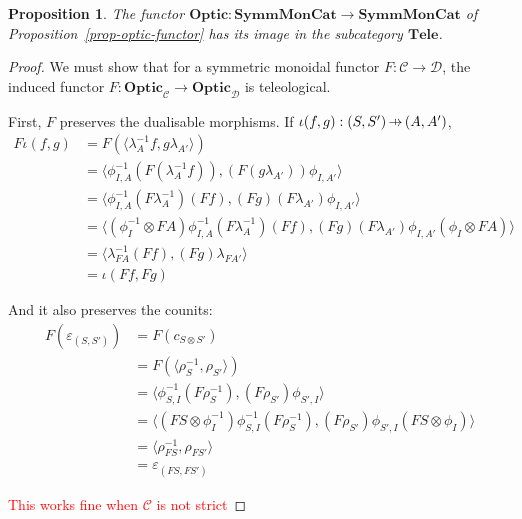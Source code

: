 \documentclass[11pt,a4paper]{article}
\theoremstyle{plain}
\newtheorem{proposition}[theorem]{Proposition}
\theoremstyle{definition}
\newcommand{\C}{\mathscr{C}}
\newcommand{\D}{\mathscr{D}}
\newcommand{\SymmMonCat}{\mathbf{SymmMonCat}}
\newcommand{\Tele}{\mathbf{Tele}}
\newcommand{\Optic}{\mathbf{Optic}}
\newcommand{\hto}{\ensuremath{\,\mathaccent\shortmid\rightarrow\,}}
\newcommand{\todo}[1]{\textcolor{red}{\small #1}}
\begin{document}

\begin{proposition}
  The functor $\Optic : \SymmMonCat \to \SymmMonCat$ of Proposition~\ref{prop-optic-functor} has its image in the subcategory $\Tele$.
\end{proposition}
\begin{proof}
  We must show that for a symmetric monoidal functor $F : \C \to \D$, the induced functor $F : \Optic_\C \to \Optic_\D$ is teleological.

  First, $F$ preserves the dualisable morphisms. If $\iota(f, g) : (S, S') \hto (A, A')$,
  \begin{align*}
    F\iota(f, g)
    &= F(\langle \lambda_A^{-1} f, g \lambda_{A'} \rangle) \\
    &= \langle \phi^{-1}_{I,A} (F(\lambda_A^{-1} f)), (F(g \lambda_{A'})) \phi_{I,A'}\rangle \\
    &= \langle \phi^{-1}_{I,A} (F\lambda_A^{-1}) (Ff), (Fg)(F \lambda_{A'}) \phi_{I,A'}\rangle \\
    &= \langle (\phi^{-1}_I \otimes FA) \phi^{-1}_{I,A} (F\lambda_A^{-1}) (Ff), (Fg)(F \lambda_{A'}) \phi_{I,A'} (\phi_I \otimes FA) \rangle \\
    &= \langle \lambda_{FA}^{-1} (Ff), (Fg)\lambda_{FA'} \rangle \\
    &= \iota(Ff, Fg)
  \end{align*}

  And it also preserves the counits:
  \begin{align*}
    F(\varepsilon_{(S, S')})
    &= F(c_{S \otimes S'}) \\
    &= F(\langle \rho_S^{-1}, \rho_{S'} \rangle) \\
    &= \langle \phi^{-1}_{S,I} (F \rho_S^{-1}), (F \rho_{S'}) \phi_{S',I}\rangle \\
    &= \langle (FS \otimes \phi_I^{-1}) \phi^{-1}_{S,I} (F \rho_S^{-1}), (F \rho_{S'}) \phi_{S',I} (FS \otimes \phi_I)\rangle \\
    &= \langle \rho_{FS}^{-1}, \rho_{FS'} \rangle \\
    &= \varepsilon_{(FS, FS')}
  \end{align*}

  \todo{This works fine when $\C$ is not strict}
\end{proof}
\end{document}

